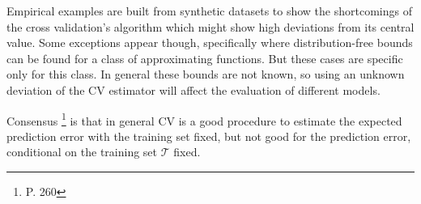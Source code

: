 Empirical examples are built from synthetic datasets to show the shortcomings of the cross validation's algorithm which might show high deviations from its central value. Some exceptions appear though, specifically where distribution-free bounds can be found for a class of approximating functions. But these cases are specific only for this class. In general these bounds are not known, so using an unknown deviation of the CV estimator will affect the evaluation of different models.

Consensus \footnote{\cite{hastie-elemstatslearn} P. 260} is that in general CV is a good procedure to estimate the expected prediction error with the training set fixed, but not good for the prediction error, conditional on the training set $\mathcal{T}$ fixed.

